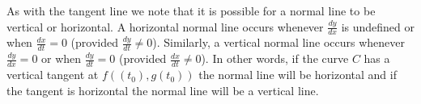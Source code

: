 As with the tangent line we note that it is possible for a normal line to be vertical or horizontal. A horizontal normal line occurs whenever $\frac{dy}{dx}$ is undefined or when $\frac{dx}{dt} = 0$ (provided $\frac{dy}{dt} \neq 0$). Similarly, a vertical normal line occurs whenever $\frac{dy}{dx} = 0$ or when $\frac{dy}{dt} = 0$ (provided $\frac{dx}{dt} \neq 0$). In other words, if the curve $C$ has a vertical tangent  at $f((t_0), g(t_0))$ the normal line will be horizontal and if the tangent is horizontal the normal line will be a vertical line.


